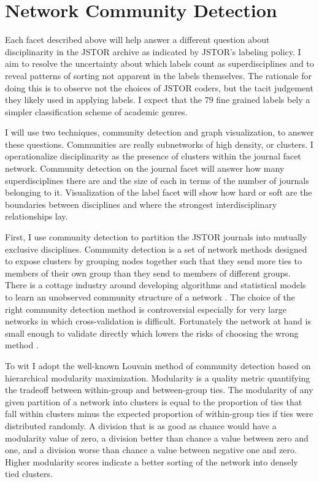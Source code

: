 \documentclass[]{book}
\theoremstyle{definition}
\theoremstyle{definition}
\theoremstyle{definition}
\theoremstyle{remark}
\begin{document}
\hypertarget{network-community-detection}{%
\section{Network Community
Detection}\label{network-community-detection}}

Each facet described above will help answer a different question about
disciplinarity in the JSTOR archive as indicated by JSTOR's labeling
policy. I aim to resolve the uncertainty about which labels count as
superdisciplines and to reveal patterns of sorting not apparent in the
labels themselves. The rationale for doing this is to observe not the
choices of JSTOR coders, but the tacit judgement they likely used in
applying labels. I expect that the 79 fine grained labels bely a simpler
classification scheme of academic genres.

I will use two techniques, community detection and graph visualization,
to answer these questions. Communities are really subnetworks of high
density, or clusters. I operationalize disciplinarity as the presence of
clusters within the journal facet network. Community detection on the
journal facet will answer how many superdisciplines there are and the
size of each in terms of the number of journals belonging to it.
Visualization of the label facet will show how hard or soft are the
boundaries between disciplines and where the strongest interdisciplinary
relationships lay.

First, I use community detection to partition the JSTOR journals into
mutually exclusive disciplines. Community detection is a set of network
methods designed to expose clusters by grouping nodes together such that
they send more ties to members of their own group than they send to
members of different groups. There is a cottage industry around
developing algorithms and statistical models to learn an unobserved
community structure of a network \citep[see][ for an excellent
review]{Fortunato2016Community}. The choice of the right community
detection method is controversial especially for very large networks in
which cross-validation is difficult. Fortunately the network at hand is
small enough to validate directly which lowers the risks of choosing the
wrong method .

To wit I adopt the well-known Louvain method of community detection
based on hierarchical modularity maximization. \citep{Blondel2008Fast}
Modularity is a quality metric quantifying the tradeoff between
within-group and between-group ties. The modularity of any given
partition of a network into clusters is equal to the proportion of ties
that fall within clusters minus the expected proportion of within-group
ties if ties were distributed randomly. A division that is as good as
chance would have a modularity value of zero, a division better than
chance a value between zero and one, and a division worse than chance a
value between negative one and zero. \citep[8]{Newman2004Finding} Higher
modularity scores indicate a better sorting of the network into densely
tied clusters.
\end{document}
